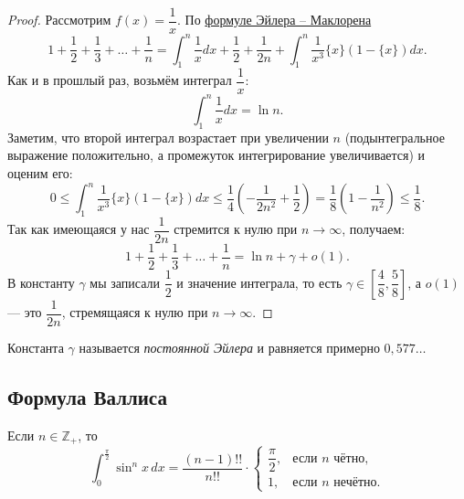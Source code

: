 \begin{proof}
	Рассмотрим \(f(x) = \dfrac{1}{x}\). По \hyperlink{eumak}{формуле Эйлера -- Маклорена} \[
	1 + \frac{1}{2} + \frac{1}{3} + \ldots + \frac{1}{n} = \int_1^n \frac{1}{x} dx + \frac{1}{2} + \frac{1}{2n} + \int_1^n \frac{1}{x^3} \{x\} (1 - \{x\}) dx.
	\] 
	Как и в прошлый раз, возьмём интеграл \(\dfrac{1}{x}\): \[
	\int_1^n \frac{1}{x} dx = \ln n.
	\]
	Заметим, что второй интеграл возрастает при увеличении \(n\) (подынтегральное выражение положительно, а промежуток интегрирование увеличивается) и оценим его: \[
	0 \leqslant \int_1^n \frac{1}{x^3} \{x\} (1 - \{x\}) dx \leqslant \frac{1}{4} \left(-\frac{1}{2n^2} + \frac{1}{2} \right) = \frac{1}{8} \left(1 - \frac{1}{n^2} \right) \leqslant \frac{1}{8}.
	\]
	Так как имеющаяся у нас $\dfrac{1}{2n}$ стремится к нулю при \(n \to \infty\), получаем: \[
	1 + \frac{1}{2} + \frac{1}{3} + \ldots + \frac{1}{n} = \ln n + \gamma + o(1).
	\]
	В константу \(\gamma\) мы записали \(\dfrac{1}{2}\) и значение интеграла, то есть \(\gamma \in \left[\dfrac{4}{8}, \dfrac{5}{8}\right]\), а \(o(1)\) --- это \(\dfrac{1}{2n}\), стремящаяся к нулю при \(n \to \infty\).
\end{proof}

\begin{remark}
	Константа \(\gamma\) называется \textit{постоянной Эйлера} и равняется примерно \(0,577\ldots\)
\end{remark}

\subsection{Формула Валлиса}

\hypertarget{vallem}{}
\begin{lemma}
	Если \(n \in \mathbb{Z}_+\), то \[
	\int_0^{\frac{\pi}{2}} \sin^n x \, dx = \frac{(n - 1)!!}{n!!} \cdot
	\begin{cases}
		\dfrac{\pi}{2}, &\text{если \(n\) чётно}, \\
		1, 				&\text{если \(n\) нечётно}.
	\end{cases}
	\]
\end{lemma}

